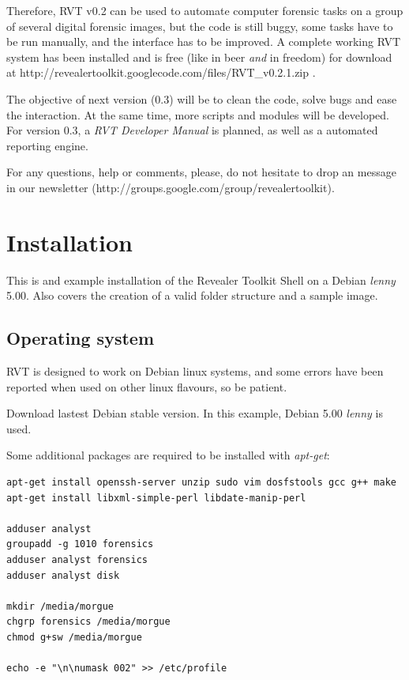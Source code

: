 \documentclass[a4paper,11pt,oneside]{report}
\begin{document}
Therefore, RVT v0.2 can be used to automate computer forensic tasks on a group of several digital forensic images, but the code is still buggy, some tasks have to be run manually, and the interface has to be improved. A complete working RVT system has been installed and is free (like in beer \emph{and} in freedom) for download at  http://revealertoolkit.googlecode.com/files/RVT\_v0.2.1.zip .

The objective of next version (0.3) will be to clean the code, solve bugs and ease the interaction. At the same time, more scripts and modules will be developed. For version 0.3, a \emph{RVT Developer Manual} is planned, as well as a automated reporting engine.

For any questions, help or comments, please, do not hesitate to drop an message in our newsletter (http://groups.google.com/group/revealertoolkit).





\chapter{Installation} \label{sec:installation}

This is and example installation of the Revealer Toolkit Shell on a Debian \emph{lenny} 5.00. Also covers the creation of a valid folder structure and a sample image.

\section{Operating system}

RVT is designed to work on Debian linux systems, and some errors have been reported when used on other linux flavours, so be patient.  

Download lastest Debian stable version. In this example, Debian 5.00 \emph{lenny} is used.

Some additional packages are required to be installed with \emph{apt-get}:

\begin{verbatim}
apt-get install openssh-server unzip sudo vim dosfstools gcc g++ make
apt-get install libxml-simple-perl libdate-manip-perl 

adduser analyst
groupadd -g 1010 forensics
adduser analyst forensics
adduser analyst disk

mkdir /media/morgue
chgrp forensics /media/morgue
chmod g+sw /media/morgue

echo -e "\n\numask 002" >> /etc/profile
\end{verbatim}
\end{document}
